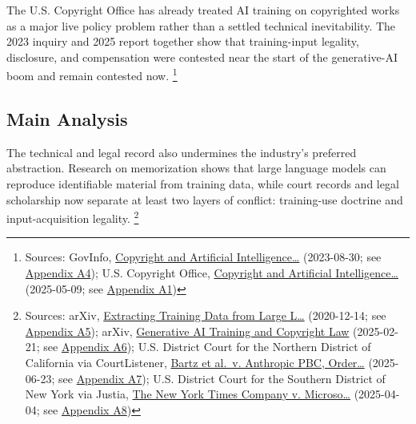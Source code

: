 \documentclass[
  american,
  11pt,
  letterpaper,
]{article}
\begin{document}
The U.S. Copyright Office has already treated AI training on copyrighted
works as a major live policy problem rather than a settled technical
inevitability. The 2023 inquiry and 2025 report together show that
training-input legality, disclosure, and compensation were contested
near the start of the generative-AI boom and remain contested now.
\footnote{Sources: GovInfo,
  \href{https://www.govinfo.gov/content/pkg/FR-2023-08-30/pdf/2023-18624.pdf}{Copyright
  and Artificial Intelligence\ldots{}} (2023-08-30; see
  \hyperref[ch-04-appendix-a4-copyright-and-artificial-intelligence-notice-of-inquiry]{Appendix
  A4}); U.S. Copyright Office,
  \href{https://copyright.gov/ai/Copyright-and-Artificial-Intelligence-Part-3-Generative-AI-Training-Report-Pre-Publication-Version.pdf}{Copyright
  and Artificial Intelligence\ldots{}} (2025-05-09; see
  \hyperref[ch-04-appendix-a1-copyright-and-artificial-intelligence-part-3-generative-ai-training-pre-publication-version]{Appendix
  A1})}

\subsection{Main Analysis}\label{main-analysis-4}

The technical and legal record also undermines the industry's preferred
abstraction. Research on memorization shows that large language models
can reproduce identifiable material from training data, while court
records and legal scholarship now separate at least two layers of
conflict: training-use doctrine and input-acquisition legality.
\footnote{Sources: arXiv,
  \href{https://arxiv.org/abs/2012.07805}{Extracting Training Data from
  Large L\ldots{}} (2020-12-14; see
  \hyperref[ch-04-appendix-a5-extracting-training-data-from-large-language-models]{Appendix
  A5}); arXiv, \href{https://arxiv.org/abs/2502.15858}{Generative AI
  Training and Copyright Law} (2025-02-21; see
  \hyperref[ch-04-appendix-a6-generative-ai-training-and-copyright-law]{Appendix
  A6}); U.S. District Court for the Northern District of California via
  CourtListener,
  \href{https://storage.courtlistener.com/recap/gov.uscourts.cand.434709/gov.uscourts.cand.434709.231.0_3.pdf}{Bartz
  et al.~v. Anthropic PBC, Order\ldots{}} (2025-06-23; see
  \hyperref[ch-04-appendix-a7-bartz-et-al-v-anthropic-pbc-order-on-fair-use]{Appendix
  A7}); U.S. District Court for the Southern District of New York via
  Justia,
  \href{https://cases.justia.com/federal/district-courts/new-york/nysdce/1\%3A2023cv11195/612697/514/0.pdf?ts=1743868265}{The
  New York Times Company v. Microso\ldots{}} (2025-04-04; see
  \hyperref[ch-04-appendix-a8-the-new-york-times-company-v-microsoft-corporation-et-al-opinion-on-motions-to-dismiss]{Appendix
  A8})}
\end{document}
